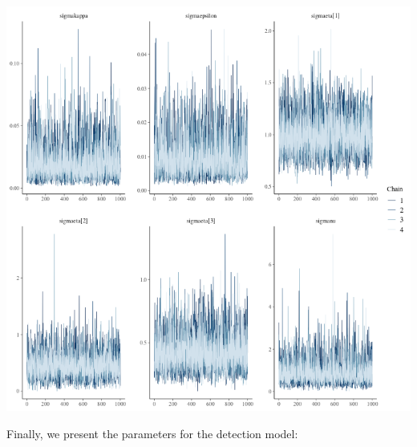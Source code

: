 \documentclass[a4paper]{article}
\newenvironment{Default Paragraph Font}{}{}
\begin{document}
\begin{knitrout}
\color{fgcolor}\begin{kframe}
\begin{alltt}
 \hlstd{=}\hlstd{(}\hlstd{,}\hlstd{,}\hlstd{,}
                            \hlstd{))}
\end{alltt}
\end{kframe}

{\centering \includegraphics[width=\linewidth,height=\linewidth]{caperpy-traceplot-sigma-1} 

}



\end{knitrout}

Finally, we present the parameters for the detection model:
\end{document}
